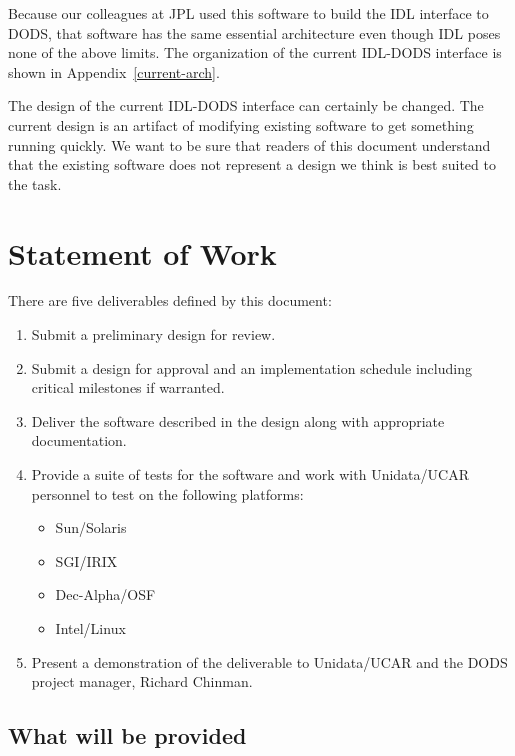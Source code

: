 \documentclass[12pt]{article}
\begin{document}
Because our colleagues at JPL used this software to build the IDL interface to
DODS, that software has the same essential architecture even though IDL poses
none of the above limits. The organization of the current IDL-DODS interface
is shown in Appendix~\ref{current-arch}.

The design of the current IDL-DODS interface can certainly be changed. The
current design is an artifact of modifying existing software to get something
running quickly. We want to be sure that readers of this document understand
that the existing software does not represent a design we think is best
suited to the task.

\section{Statement of Work}

There are five deliverables defined by this document:

\begin{enumerate}

\item Submit a preliminary design for review.

\item Submit a design for approval and an implementation schedule including
  critical milestones if warranted.

\item Deliver the software described in the design along with appropriate
  documentation. 

\item Provide a suite of tests for the software and work with Unidata/UCAR
  personnel to test on the following platforms: 

  \begin{itemize}
    \item Sun/Solaris
    \item SGI/IRIX
    \item Dec-Alpha/OSF
    \item Intel/Linux
  \end{itemize}
  
\item Present a demonstration of the deliverable to Unidata/UCAR and the
  DODS project manager, Richard Chinman.

\end{enumerate}

\subsection{What will be provided}
\end{document}
